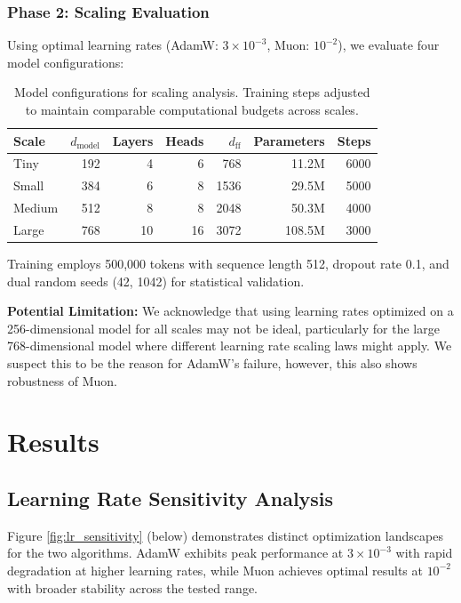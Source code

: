 \documentclass[11pt,a4paper]{article}
\begin{document}
\subsubsection{Phase 2: Scaling Evaluation}
Using optimal learning rates (AdamW: $3 \times 10^{-3}$, Muon: $10^{-2}$), we evaluate four model configurations:

\begin{table}[H]
\centering
\caption{Model configurations for scaling analysis. Training steps adjusted to maintain comparable computational budgets across scales.}
\label{tab:model_configs}
\begin{tabular}{@{}lrrrrrr@{}}
\toprule
\textbf{Scale} & \textbf{$d_{\text{model}}$} & \textbf{Layers} & \textbf{Heads} & \textbf{$d_{\text{ff}}$} & \textbf{Parameters} & \textbf{Steps} \\
\midrule
Tiny   & 192  & 4  & 6  & 768   & 11.2M  & 6000 \\
Small  & 384  & 6  & 8  & 1536  & 29.5M  & 5000 \\
Medium & 512  & 8  & 8  & 2048  & 50.3M  & 4000 \\
Large  & 768  & 10 & 16 & 3072  & 108.5M & 3000 \\
\bottomrule
\end{tabular}
\end{table}

Training employs 500,000 tokens with sequence length 512, dropout rate 0.1, and dual random seeds (42, 1042) for statistical validation.

\textbf{Potential Limitation:} We acknowledge that using learning rates optimized on a 256-dimensional model for all scales may not be ideal, particularly for the large 768-dimensional model where different learning rate scaling laws might apply. We suspect this to be the reason for AdamW's failure, however, this also shows robustness of Muon.

\section{Results}

\subsection{Learning Rate Sensitivity Analysis}

Figure \ref{fig:lr_sensitivity} (below) demonstrates distinct optimization landscapes for the two algorithms. AdamW exhibits peak performance at $3 \times 10^{-3}$ with rapid degradation at higher learning rates, while Muon achieves optimal results at $10^{-2}$ with broader stability across the tested range.
\end{document}

